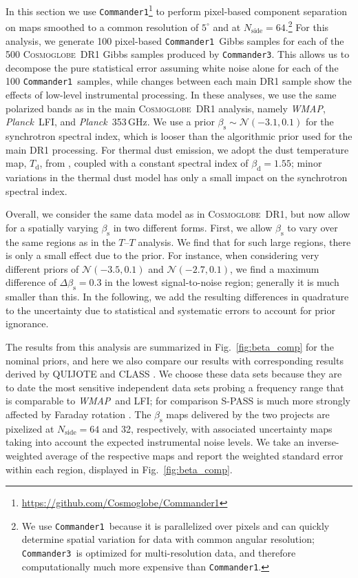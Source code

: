 \documentclass[twocolumn]{../../common/aa}
\def\WMAP{\emph{WMAP}}
\def\Planck{\emph{Planck}}
\def\commanderone{\texttt{Commander1}}
\def\commanderthree{\texttt{Commander3}}
\newcommand{\cosmoglobe}{\textsc{Cosmoglobe}}
\begin{document}
In this section we use \commanderone\footnote{\url{https://github.com/Cosmoglobe/Commander1}} to perform pixel-based component separation on maps smoothed to a common resolution of $5^\circ$ and at $N_\mathrm{side}=64$.\footnote{We use \commanderone\ because it is parallelized over pixels and can quickly determine spatial variation for data with common angular resolution; \commanderthree\ is optimized for multi-resolution data, and therefore computationally much more expensive than \commanderone.}
For this analysis, we generate 100 pixel-based \commanderone\ Gibbs samples for each of the 500 \cosmoglobe\ DR1 Gibbs samples produced by \commanderthree. This allows us to decompose the pure statistical error assuming white noise alone for each of the 100 \commanderone\ samples, while changes between each main DR1 sample show the effects of low-level instrumental processing. In these analyses, we use the same polarized bands as in the main \cosmoglobe\ DR1 analysis, namely \WMAP, \Planck\ LFI, and \Planck\ 353\,GHz. We use a prior $\beta_\mathrm s\sim\mathcal N(-3.1, 0.1)$ for the synchrotron spectral index, which is looser than the algorithmic prior used for the main DR1 processing. For thermal dust emission, we adopt the dust temperature map, $T_\mathrm d$, from \citet{planck2014-a12}, coupled with a constant spectral index of $\beta_\mathrm d=1.55$; minor variations in the thermal dust model has only a small impact on the synchrotron spectral index.

Overall, we consider the same data model as in \cosmoglobe\ DR1, but now allow for a spatially varying $\beta_\mathrm s$ in two different forms.
First, we allow $\beta_\mathrm s$ to vary over the same regions as in the $T$--$T$ analysis.
We find that for such large regions, there is only a small effect due to the prior. For instance, when considering very different priors of $\mathcal N(-3.5,0.1)$ and $\mathcal N(-2.7, 0.1)$, we find a maximum difference of $\Delta\beta_{\mathrm{s}}=0.3$ in the lowest signal-to-noise region; generally it is much smaller than this. In the following, we add the resulting differences in quadrature to the uncertainty due to statistical and systematic errors to account for prior ignorance. 

The results from this analysis are summarized in Fig.~\ref{fig:beta_comp} for the nominal priors, and here we also compare our results with corresponding results derived by QUIJOTE \citep{QUIJOTE_VIII} and CLASS \citep{eimer2023}. We choose these data sets because they are to date the most sensitive independent data sets probing a frequency range that is comparable to \WMAP\ and LFI; for comparison S-PASS is much more strongly affected by Faraday rotation \citep{krachmalnicoff2018,fuskeland:2019}. The $\beta_\mathrm s$ maps delivered by the two projects are pixelized at $N_\mathrm{side}=64$ and 32, respectively, with associated uncertainty maps taking into account the expected instrumental noise levels. We take an inverse-weighted average of the respective maps and report the weighted standard error within each region, displayed in Fig.~\ref{fig:beta_comp}. 
\end{document}

